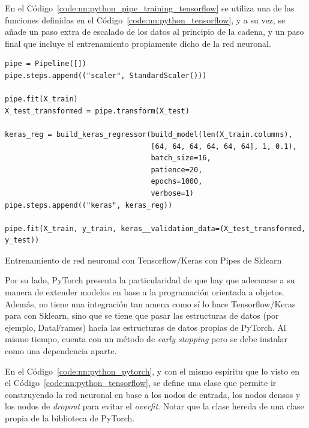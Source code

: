 \documentclass[11pt]{article}
\newcommand{\english}[1]{\textit{#1}}
\begin{document}
En el Código~\ref{code:nn:python_pipe_training_tensorflow} se utiliza una de las funciones definidas en el Código~\ref{code:nn:python_tensorflow}, y a su vez, se añade un paso extra de escalado de los datos al principio de la cadena, y un paso final que incluye el entrenamiento propiamente dicho de la red neuronal. 

\begin{listing}
\begin{verbatim}
pipe = Pipeline([])
pipe.steps.append(("scaler", StandardScaler()))

pipe.fit(X_train)
X_test_transformed = pipe.transform(X_test)

keras_reg = build_keras_regressor(build_model(len(X_train.columns),
                                  [64, 64, 64, 64, 64, 64], 1, 0.1),
                                  batch_size=16,
                                  patience=20,
                                  epochs=1000,
                                  verbose=1)
pipe.steps.append(("keras", keras_reg))

pipe.fit(X_train, y_train, keras__validation_data=(X_test_transformed, y_test))
\end{verbatim}
\caption{Entrenamiento de red neuronal con Tensorflow/Keras con Pipes de Sklearn}
\label{code:nn:python_pipe_training_tensorflow}
\end{listing}

Por su lado, PyTorch presenta la particularidad de que hay que adecuarse a su manera de extender modelos en base a la programación orientada a objetos. Además, no tiene una integración tan amena como sí lo hace Tensorflow/Keras para con Sklearn, sino que se tiene que pasar las estructuras de datos (por ejemplo, DataFrames) hacia las estructuras de datos propias de PyTorch. Al mismo tiempo, cuenta con un método de \english{early stopping} pero se debe instalar como una dependencia aparte.

En el Código~\ref{code:nn:python_pytorch}, y con el mismo espíritu que lo visto en el Código~\ref{code:nn:python_tensorflow}, se define una clase que permite ir construyendo la red neuronal en base a los nodos de entrada, los nodos densos y los nodos de \english{dropout} para evitar el \english{overfit}. Notar que la clase hereda de una clase propia de la biblioteca de PyTorch.
\end{document}
